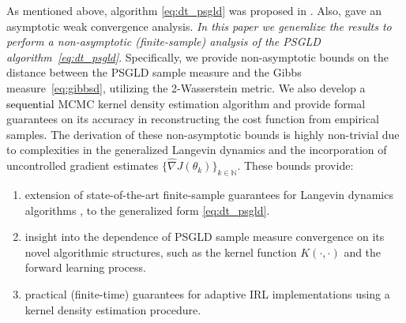 \documentclass[journal,onecolumn]{IEEEtran}
\newcommand{\alk}{\alpha_k}
\newcommand{\thk}{\theta_k}
\newcommand{\gradn}{\hat{\nabla}}
\newcommand{\rew}{J}
\newcommand{\reals}{\mathbb{R}}
\newcommand{\dimn}{N}
\newcommand{\idistr}{\ids_0}
\newcommand{\N}{\mathbb{N}}
\newcommand{\ids}{\pi}
\begin{document}


As mentioned above, algorithm \eqref{eq:dt_psgld} was proposed in \cite{krishnamurthy2021langevin}. Also,  \cite{krishnamurthy2021langevin} gave an asymptotic weak convergence analysis.
\textit{In this paper we generalize the results \cite{raginsky2017non} to perform a non-asymptotic (finite-sample) analysis of the PSGLD algorithm~\eqref{eq:dt_psgld}}. Specifically, we provide non-asymptotic bounds on the distance between the PSGLD sample measure and the Gibbs measure~\eqref{eq:gibbsd}, utilizing the 2-Wasserstein metric. {\color{black}We also develop a \textcolor{black}{sequential} MCMC kernel density estimation algorithm and provide formal guarantees on its accuracy in reconstructing the cost function from empirical samples.} The derivation of these non-asymptotic bounds is highly non-trivial due to complexities in the generalized Langevin dynamics  and the incorporation of uncontrolled gradient estimates $\{\gradn\rew(\thk)\}_{k\in\N}$. These bounds provide:
\begin{enumerate}
    \item[-] extension of state-of-the-art finite-sample guarantees for Langevin dynamics algorithms \cite{raginsky2017non}, \cite{dalalyan2019user} to the generalized form \eqref{eq:dt_psgld}.
    \item[-] insight into the dependence of PSGLD sample measure convergence on its novel algorithmic structures, such as the kernel function $K(\cdot,\cdot)$ {\color{black} and the forward learning process.}
    \item[-] practical (finite-time) guarantees for adaptive IRL implementations {\color{black}using a kernel density estimation procedure}.
\end{enumerate}
\end{document}
